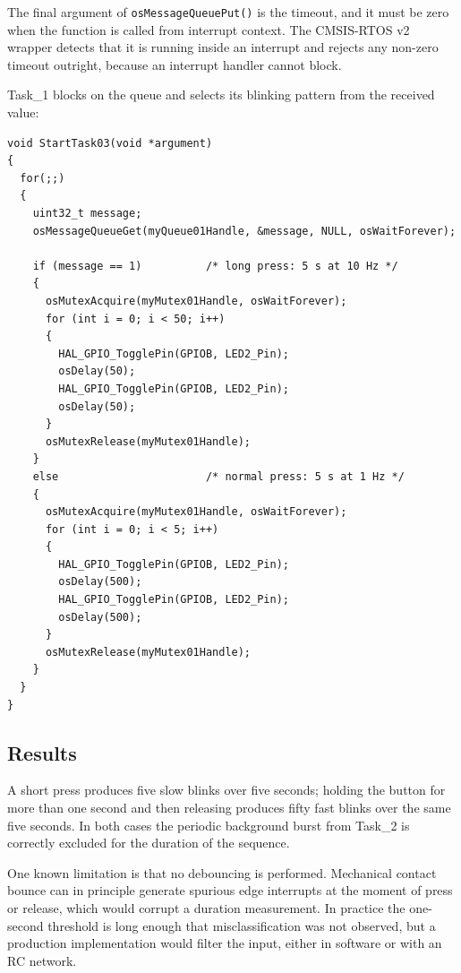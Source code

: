 \documentclass[11pt,a4paper]{article}
\begin{document}
The final argument of \texttt{osMessageQueuePut()} is the timeout, and it must
be zero when the function is called from interrupt context. The CMSIS-RTOS v2
wrapper detects that it is running inside an interrupt and rejects any
non-zero timeout outright, because an interrupt handler cannot block.

Task\_1 blocks on the queue and selects its blinking pattern from the received
value:

\begin{lstlisting}[caption={Task\_1: selecting a blink pattern from the queue message.}]
void StartTask03(void *argument)
{
  for(;;)
  {
    uint32_t message;
    osMessageQueueGet(myQueue01Handle, &message, NULL, osWaitForever);

    if (message == 1)          /* long press: 5 s at 10 Hz */
    {
      osMutexAcquire(myMutex01Handle, osWaitForever);
      for (int i = 0; i < 50; i++)
      {
        HAL_GPIO_TogglePin(GPIOB, LED2_Pin);
        osDelay(50);
        HAL_GPIO_TogglePin(GPIOB, LED2_Pin);
        osDelay(50);
      }
      osMutexRelease(myMutex01Handle);
    }
    else                       /* normal press: 5 s at 1 Hz */
    {
      osMutexAcquire(myMutex01Handle, osWaitForever);
      for (int i = 0; i < 5; i++)
      {
        HAL_GPIO_TogglePin(GPIOB, LED2_Pin);
        osDelay(500);
        HAL_GPIO_TogglePin(GPIOB, LED2_Pin);
        osDelay(500);
      }
      osMutexRelease(myMutex01Handle);
    }
  }
}
\end{lstlisting}

\subsection{Results}

A short press produces five slow blinks over five seconds; holding the button
for more than one second and then releasing produces fifty fast blinks over
the same five seconds. In both cases the periodic background burst from
Task\_2 is correctly excluded for the duration of the sequence.

One known limitation is that no debouncing is performed. Mechanical contact
bounce can in principle generate spurious edge interrupts at the moment of
press or release, which would corrupt a duration measurement. In practice the
one-second threshold is long enough that misclassification was not observed,
but a production implementation would filter the input, either in software or
with an RC network.

\end{document}
